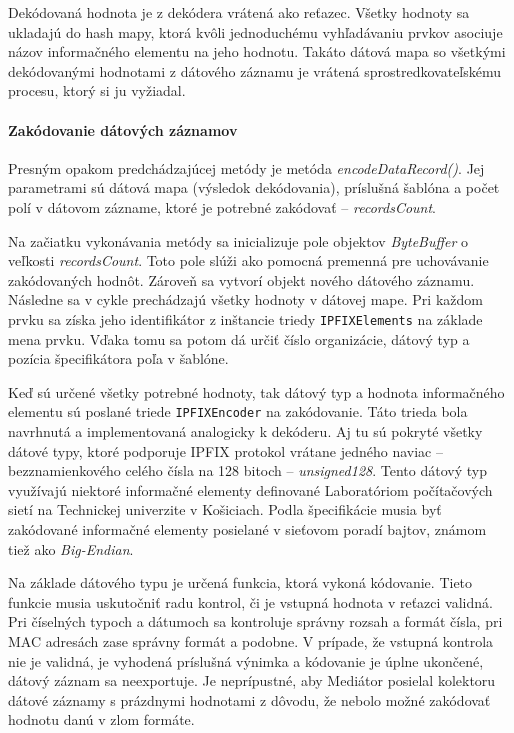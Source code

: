 Dekódovaná hodnota je z dekódera vrátená ako reťazec. Všetky hodnoty sa ukladajú do hash mapy, ktorá 
kvôli jednoduchému vyhľadávaniu prvkov asociuje názov informačného elementu na jeho hodnotu. 
Takáto dátová mapa so všetkými dekódovanými hodnotami z dátového záznamu je vrátená sprostredkovateľskému 
procesu, ktorý si ju vyžiadal.


\paragraph{Zakódovanie dátových záznamov} 
Presným opakom predchádzajúcej metódy je metóda \emph{encodeDataRecord()}. Jej parametrami sú dátová 
mapa (výsledok dekódovania), príslušná šablóna a počet polí v dátovom zázname, ktoré je potrebné 
zakódovať -- \emph{recordsCount}.

Na začiatku vykonávania metódy sa inicializuje pole objektov \emph{ByteBuffer} o veľkosti \emph{recordsCount}.
Toto pole slúži ako pomocná premenná pre uchovávanie zakódovaných hodnôt. Zároveň sa vytvorí objekt 
nového dátového záznamu.
Následne sa v cykle prechádzajú všetky hodnoty v dátovej mape. Pri každom prvku sa získa jeho identifikátor
z inštancie triedy \verb|IPFIXElements| na základe mena prvku. Vďaka tomu sa potom dá určiť číslo
organizácie, dátový typ a pozícia špecifikátora poľa v šablóne. 

Keď sú určené všetky potrebné hodnoty, tak dátový typ a hodnota informačného elementu sú poslané triede 
\verb|IPFIXEncoder| na zakódovanie. Táto trieda bola navrhnutá a implementovaná analogicky k dekóderu. 
Aj tu sú pokryté všetky dátové typy, ktoré podporuje IPFIX protokol vrátane jedného naviac -- bezznamienkového
celého čísla na 128 bitoch -- \emph{unsigned128}. Tento dátový typ využívajú niektoré informačné elementy 
definované Laboratóriom počítačových sietí na Technickej univerzite v Košiciach. Podla špecifikácie
\citep{rfc5101} musia byť zakódované informačné elementy posielané v sieťovom poradí bajtov, známom 
tiež ako \emph{Big-Endian}. 

Na základe dátového typu je určená funkcia, ktorá vykoná kódovanie. 
Tieto funkcie musia uskutočniť radu kontrol, či je vstupná hodnota v reťazci validná. 
Pri číselných typoch a dátumoch sa kontroluje správny rozsah a formát čísla, pri MAC adresách zase 
správny formát a podobne.
V prípade, že vstupná kontrola nie je validná, je vyhodená príslušná výnimka a 
kódovanie je úplne ukončené, dátový záznam sa neexportuje. Je neprípustné, aby Mediátor posielal kolektoru
dátové záznamy s prázdnymi hodnotami z dôvodu, že nebolo možné zakódovať hodnotu danú v zlom formáte.  

